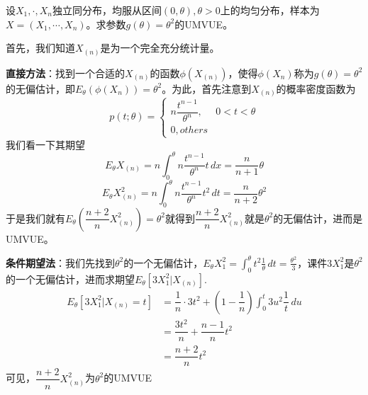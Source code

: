 \begin{example}
    设$X_1,\cdot,X_n$独立同分布，均服从区间$(0,\theta),\theta>0$上的均匀分布，样本为$X = \left( X_1,\cdots,X_n \right)$。求参数$g(\theta) = \theta^2$的UMVUE。

    首先，我们知道$X_{(n)}$是为一个完全充分统计量。

    \textbf{直接方法}：找到一个合适的$X_{(n)}$的函数$\phi(X_{(n)})$，使得$\phi(X_{n})$称为$g(\theta) = \theta^2$的无偏估计，即$E_{\theta}(\phi(X_{n})) = \theta^2$。为此，首先注意到$X_{(n)}$的概率密度函数为
    \[
        p(t;\theta) = \left\{
            \begin{array}{ll}
                n\dfrac{t^{n-1}}{\theta^n}, & 0<t<\theta\\
                0, others
            \end{array}
        \right.
    \]
    我们看一下其期望
    \[
        E_{\theta}X_{(n)} =  n\int_{0}^{\theta}n\dfrac{t^{n-1}}{\theta^n}t  \,dx = \dfrac{n}{n+1}\theta
    \]
    \[
        E_{\theta}X_{(n)}^2 =  n\int_{0}^{\theta}n\dfrac{t^{n-1}}{\theta^n}t^2  \,dt = \dfrac{n}{n+2}\theta^2
    \]
    于是我们就有$E_{\theta} \left( \dfrac{n+2}{n}X_{(n)}^2 \right) = \theta^2$就得到$ \dfrac{n+2}{n}X_{(n)}^2 $就是$\theta^2$的无偏估计，进而是UMVUE。

    \textbf{条件期望法}：我们先找到$\theta^2$的一个无偏估计，$E_{\theta}X_{1}^2 =\int_{0}^{\theta}t^2\frac{1}{\theta} \,dt= \frac{\theta^2}{3}$，课件$3X_{1}^2$是$\theta^2$的一个无偏估计，进而求期望$E_{\theta}\left[ 3X_{1}^2|X_{(n)} \right]$.
    \[
        \begin{array}{ll}
            E_{\theta}\left[ 3X_{1}^2|X_{(n)} =t \right]&=\dfrac{1}{n}
            \cdot 3t^2 + (1-\dfrac{1}{n})\int_{0}^{t}3u^2\dfrac{1}{t}\, du\\
            &=\dfrac{3t^2}{n} + \dfrac{n-1}{n}t^2\\
            &=\dfrac{n+2}{n}t^2
        \end{array}
    \]
    可见，$\dfrac{n+2}{n}X_{(n)}^2$为$\theta^2$的UMVUE
\end{example}

